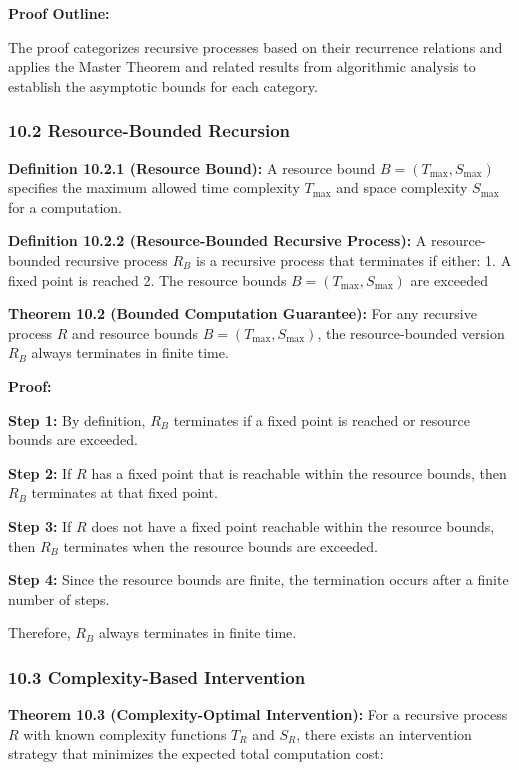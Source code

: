 \documentclass[
]{article}
\begin{document}
\textbf{Proof Outline:}

The proof categorizes recursive processes based on their recurrence
relations and applies the Master Theorem and related results from
algorithmic analysis to establish the asymptotic bounds for each
category.

\subsubsection{10.2 Resource-Bounded
Recursion}\label{resource-bounded-recursion}

\textbf{Definition 10.2.1 (Resource Bound):} A resource bound
\(B = (T_{\max}, S_{\max})\) specifies the maximum allowed time
complexity \(T_{\max}\) and space complexity \(S_{\max}\) for a
computation.

\textbf{Definition 10.2.2 (Resource-Bounded Recursive Process):} A
resource-bounded recursive process \(R_B\) is a recursive process that
terminates if either: 1. A fixed point is reached 2. The resource bounds
\(B = (T_{\max}, S_{\max})\) are exceeded

\textbf{Theorem 10.2 (Bounded Computation Guarantee):} For any recursive
process \(R\) and resource bounds \(B = (T_{\max}, S_{\max})\), the
resource-bounded version \(R_B\) always terminates in finite time.

\textbf{Proof:}

\textbf{Step 1:} By definition, \(R_B\) terminates if a fixed point is
reached or resource bounds are exceeded.

\textbf{Step 2:} If \(R\) has a fixed point that is reachable within the
resource bounds, then \(R_B\) terminates at that fixed point.

\textbf{Step 3:} If \(R\) does not have a fixed point reachable within
the resource bounds, then \(R_B\) terminates when the resource bounds
are exceeded.

\textbf{Step 4:} Since the resource bounds are finite, the termination
occurs after a finite number of steps.

Therefore, \(R_B\) always terminates in finite time.

\subsubsection{10.3 Complexity-Based
Intervention}\label{complexity-based-intervention}

\textbf{Theorem 10.3 (Complexity-Optimal Intervention):} For a recursive
process \(R\) with known complexity functions \(T_R\) and \(S_R\), there
exists an intervention strategy that minimizes the expected total
computation cost:
\end{document}
